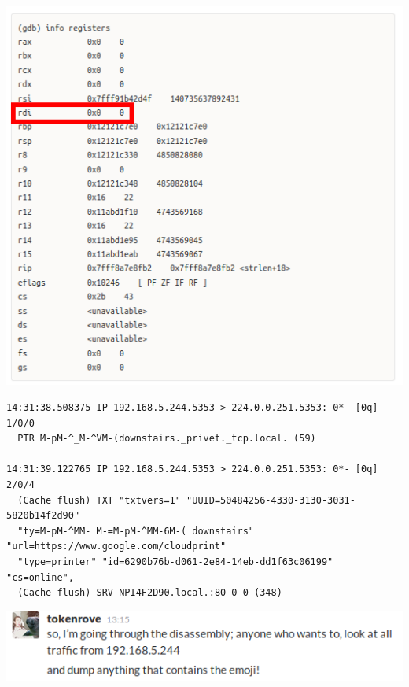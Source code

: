 \documentclass[aspectratio=169]{beamer}
\begin{document}
\begin{frame}
  \begin{center}
    \includegraphics[scale=0.5]{info-registers}
  \end{center}
\end{frame}

\begin{frame}[fragile]
\begin{verbatim}
14:31:38.508375 IP 192.168.5.244.5353 > 224.0.0.251.5353: 0*- [0q] 1/0/0
  PTR M-pM-^_M-^VM-(downstairs._privet._tcp.local. (59)

14:31:39.122765 IP 192.168.5.244.5353 > 224.0.0.251.5353: 0*- [0q] 2/0/4
  (Cache flush) TXT "txtvers=1" "UUID=50484256-4330-3130-3031-5820b14f2d90"
  "ty=M-pM-^MM- M-=M-pM-^MM-6M-( downstairs" "url=https://www.google.com/cloudprint"
  "type=printer" "id=6290b76b-d061-2e84-14eb-dd1f63c06199" "cs=online",
  (Cache flush) SRV NPI4F2D90.local.:80 0 0 (348)
\end{verbatim}
\includegraphics[scale=0.5]{dump-anything-with-the-emoji}
\begin{center}
\end{center}

\end{frame}
\end{document}
